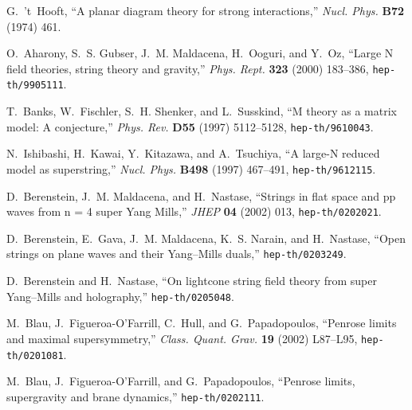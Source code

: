 \documentclass[a4paper]{article}
\begin{document}
\providecommand{\href}[2]{#2}\begingroup\raggedright\begin{thebibliography}{10}

G.~'t~Hooft, ``A planar diagram theory for strong interactions,'' {\em Nucl.
  Phys.} {\bf B72} (1974)
461.

O.~Aharony, S.~S. Gubser, J.~M. Maldacena, H.~Ooguri, and Y.~Oz,
``Large N field theories, string theory and gravity,'' {\em Phys.
Rept.} {\bf 323}
  (2000) 183--386,
\href{http://arXiv.org/abs/hep-th/9905111}{{\tt hep-th/9905111}}.

T.~Banks, W.~Fischler, S.~H. Shenker, and L.~Susskind, ``M theory as a matrix
  model: A conjecture,'' {\em Phys. Rev.} {\bf D55} (1997) 5112--5128,
\href{http://arXiv.org/abs/hep-th/9610043}{{\tt hep-th/9610043}}.

N.~Ishibashi, H.~Kawai, Y.~Kitazawa, and A.~Tsuchiya, ``A large-N
reduced model
  as superstring,'' {\em Nucl. Phys.} {\bf B498} (1997) 467--491,
\href{http://arXiv.org/abs/hep-th/9612115}{{\tt hep-th/9612115}}.

D.~Berenstein, J.~M. Maldacena, and H.~Nastase, ``Strings in flat space and pp
  waves from n = 4 super Yang Mills,'' {\em JHEP} {\bf 04} (2002) 013,
\href{http://arXiv.org/abs/hep-th/0202021}{{\tt hep-th/0202021}}.

D.~Berenstein, E.~Gava, J.~M. Maldacena, K.~S. Narain, and H.~Nastase, ``Open
  strings on plane waves and their Yang--Mills duals,''
\href{http://arXiv.org/abs/hep-th/0203249}{{\tt hep-th/0203249}}.

D.~Berenstein and H.~Nastase, ``On lightcone string field theory from super
  Yang--Mills and holography,''
\href{http://arXiv.org/abs/hep-th/0205048}{{\tt hep-th/0205048}}.

M.~Blau, J.~Figueroa-O'Farrill, C.~Hull, and G.~Papadopoulos, ``Penrose limits
  and maximal supersymmetry,'' {\em Class. Quant. Grav.} {\bf 19} (2002)
  L87--L95,
\href{http://arXiv.org/abs/hep-th/0201081}{{\tt hep-th/0201081}}.

M.~Blau, J.~Figueroa-O'Farrill, and G.~Papadopoulos, ``Penrose limits,
  supergravity and brane dynamics,''
\href{http://arXiv.org/abs/hep-th/0202111}{{\tt hep-th/0202111}}.


\end{thebibliography}
\end{document}

